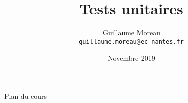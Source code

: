\documentclass[allowframebreaks,xcolor=dvipsnames]{beamer}
\title[Option RV / MEDEV] %
{Tests unitaires}
\author[G. Moreau]{Guillaume Moreau\\
\texttt{guillaume.moreau@ec-nantes.fr}}
\institute[Ecole Centrale de Nantes] %
{
  Ecole Centrale de Nantes
}
\date %
{Novembre 2019}
\begin{document}
\begin{frame}
  \titlepage
\end{frame}

\begin{frame}[allowframebreaks]{Plan du cours}
  \tableofcontents[hideallsubsections]
\end{frame}


%





\end{document}
